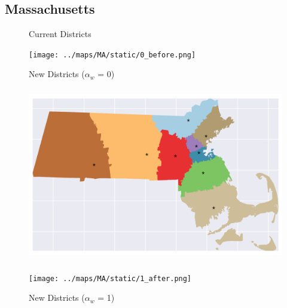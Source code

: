 \subsection{Massachusetts}
\begin{figure}[htb!] \centering
\caption{ Current Districts }
\texttt{[image: ../maps/MA/static/0\_before.png]}
\caption{ New Districts ($\alpha_w$ = 0) }
\includegraphics[width=5in,height=3in,keepaspectratio]{../maps/MA/static/0_after.png}
\caption{ New Districts ($\alpha_w$ = 1) }
\texttt{[image: ../maps/MA/static/1\_after.png]}
\end{figure}

\clearpage
\newpage

